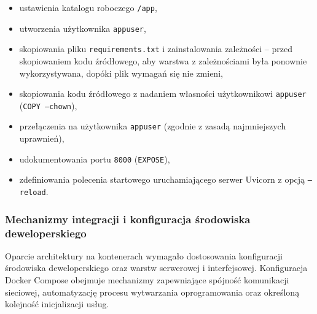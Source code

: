 \documentclass[twoside]{projektInzynierskiMS1z}
\begin{document}
\begin{itemize}
\begin{itemize}
          \texttt{--reload} w kontenerze),
        \item ustawienia katalogu roboczego \texttt{/app},
        \item utworzenia użytkownika \texttt{appuser},
        \item skopiowania pliku \texttt{requirements.txt} i zainstalowania
          zależności -- przed skopiowaniem kodu źródłowego, aby warstwa
          z zależnościami była ponownie wykorzystywana, dopóki plik wymagań się
          nie zmieni,
        \item skopiowania kodu źródłowego z nadaniem własności użytkownikowi
          \texttt{appuser} (\texttt{COPY --chown}),
        \item przełączenia na użytkownika \texttt{appuser} (zgodnie z zasadą
          najmniejszych uprawnień),
        \item udokumentowania portu \texttt{8000} (\texttt{EXPOSE}),
        \item zdefiniowania polecenia startowego uruchamiającego serwer Uvicorn
          z opcją \texttt{--reload}.
    \end{itemize}
\end{itemize}

\subsubsection{Mechanizmy integracji i konfiguracja środowiska deweloperskiego}


Oparcie architektury na kontenerach wymagało dostosowania konfiguracji
środowiska deweloperskiego oraz warstw serwerowej i interfejsowej. Konfiguracja
Docker Compose obejmuje mechanizmy zapewniające spójność komunikacji sieciowej,
automatyzację procesu wytwarzania oprogramowania oraz określoną kolejność
inicjalizacji usług.
\end{document}
